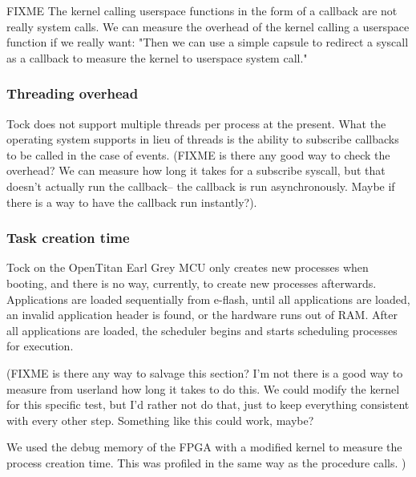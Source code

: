 \documentclass{article}
\begin{document}
FIXME The kernel calling userspace functions in the form of a callback are not really system calls. We can measure the overhead of the kernel calling a userspace function if we really want: "Then we can use a simple capsule to redirect a syscall as a callback to measure the kernel to userspace system call."

\subsubsection{Threading overhead}

Tock does not support multiple threads per process at the present. What the operating system supports in lieu of threads is the ability to subscribe callbacks to be called in the case of events. (FIXME is there any good way to check the overhead? We can measure how long it takes for a subscribe syscall, but that doesn't actually run the callback-- the callback is run asynchronously. Maybe if there is a way to have the callback run instantly?).

\subsubsection{Task creation time}

Tock on the OpenTitan Earl Grey MCU only creates new processes when booting, and there is no way, currently, to create new processes afterwards. Applications are loaded sequentially from e-flash, until all applications are loaded, an invalid application header is found, or the hardware runs out of RAM. After all applications are loaded, the scheduler begins and starts scheduling processes for execution.

(FIXME is there any way to salvage this section? I'm not there is a good way to measure from userland how long it takes to do this. We could modify the kernel for this specific test, but I'd rather not do that, just to keep everything consistent with every other step. Something like this could work, maybe?

We used the debug memory of the FPGA with a modified kernel to measure the process creation time. This was profiled in the same way as the procedure calls.
)
\end{document}
